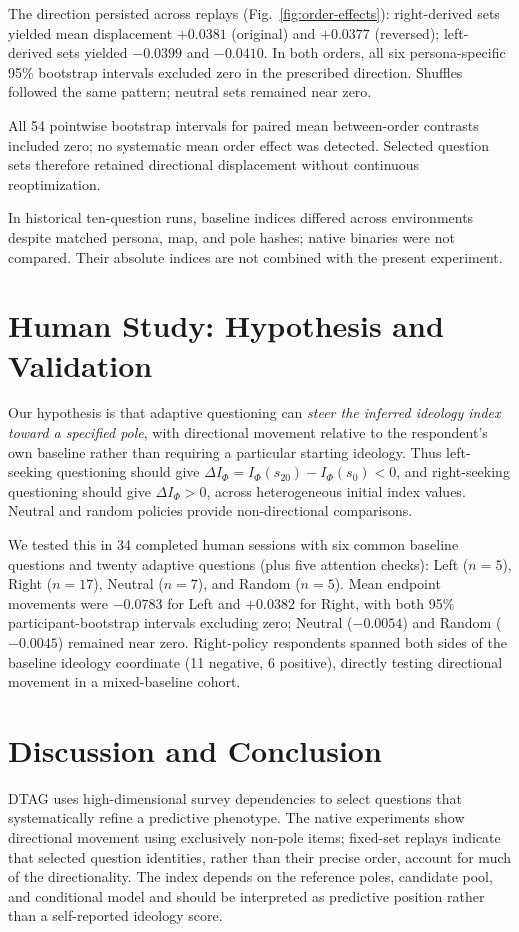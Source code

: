 \documentclass[technote,10pt]{IEEEtran}
\newcommand{\Ph}{\Phi}
\begin{document}
The direction persisted across replays (Fig.~\ref{fig:order-effects}): right-derived sets yielded mean displacement $+0.0381$ (original) and $+0.0377$ (reversed); left-derived sets yielded $-0.0399$ and $-0.0410$. In both orders, all six persona-specific 95\% bootstrap intervals excluded zero in the prescribed direction. Shuffles followed the same pattern; neutral sets remained near zero.

All 54 pointwise bootstrap intervals for paired mean between-order contrasts included zero; no systematic mean order effect was detected. Selected question sets therefore retained directional displacement without continuous reoptimization.

In historical ten-question runs, baseline indices differed across environments despite matched persona, map, and pole hashes; native binaries were not compared. Their absolute indices are not combined with the present experiment.


\section{Human Study: Hypothesis and Validation}
Our hypothesis is that adaptive questioning can \emph{steer the inferred ideology index toward a specified pole}, with directional movement relative to the respondent's own baseline rather than requiring a particular starting ideology. Thus left-seeking questioning should give $\Delta I_\Ph=I_\Ph(s_{20})-I_\Ph(s_0)<0$, and right-seeking questioning should give $\Delta I_\Ph>0$, across heterogeneous initial index values. Neutral and random policies provide non-directional comparisons.

We tested this in 34 completed human sessions with six common baseline questions and twenty adaptive questions (plus five attention checks): Left ($n=5$), Right ($n=17$), Neutral ($n=7$), and Random ($n=5$). Mean endpoint movements were $-0.0783$ for Left and $+0.0382$ for Right, with both 95\% participant-bootstrap intervals excluding zero; Neutral ($-0.0054$) and Random ($-0.0045$) remained near zero. Right-policy respondents spanned both sides of the baseline ideology coordinate (11 negative, 6 positive), directly testing directional movement in a mixed-baseline cohort.





\section{Discussion and Conclusion}
DTAG uses high-dimensional survey dependencies to select questions that systematically refine a predictive phenotype. The native experiments show directional movement using exclusively non-pole items; fixed-set replays indicate that selected question identities, rather than their precise order, account for much of the directionality. The index depends on the reference poles, candidate pool, and conditional model and should be interpreted as predictive position rather than a self-reported ideology score.
\end{document}
